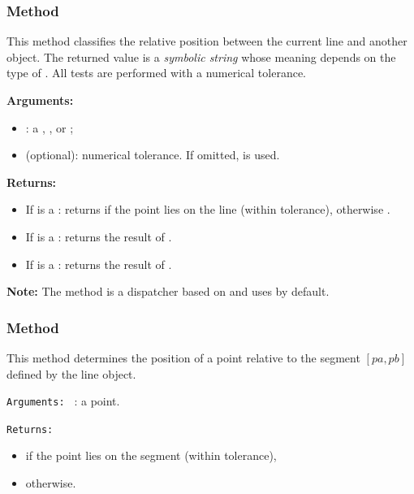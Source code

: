 \subsubsection{Method }
\label{ssub:method_line_position}

This method classifies the relative position between the current line and another object.
The returned value is a \emph{symbolic string} whose meaning depends on the type of .
All tests are performed with a numerical tolerance.

\medskip
\textbf{Arguments:}
\begin{itemize}
  \item {}: a , , or ;
  \item {} (optional): numerical tolerance. If omitted,  is used.
\end{itemize}

\medskip
\textbf{Returns:}
\begin{itemize}
  \item If  is a : returns  if the point lies on the line (within tolerance),
        otherwise .
  \item If  is a : returns the result of .
  \item If  is a : returns the result of .
\end{itemize}

\medskip
\textbf{Note:}
The method is a dispatcher based on  and uses  by default.


\subsubsection{Method }
\label{ssub:method_line_position_segment}

This method determines the position of a point relative to the segment
$[pa,pb]$ defined by the line object.

\texttt{Arguments: } : a point.

\texttt{Returns: }
\begin{itemize}
  \item {} if the point lies on the segment (within tolerance),
  \item {} otherwise.
\end{itemize}

